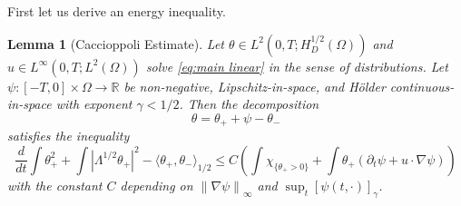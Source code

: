 \documentclass[11pt]{amsart}
\newtheorem{lemma}[theorem]{Lemma}
\theoremstyle{remark}
\theoremstyle{definition}
\newcommand{\R}{\mathbb{R}}
\newcommand{\chevron}[1]{\langle #1 \rangle}
\newcommand{\norm}[1]{\left\lVert#1\right\rVert}
\newcommand{\paren}[1]{\left( #1 \right)}
\newcommand{\bracket}[1]{\left[ #1 \right]}
\newcommand{\abs}[1]{\left\lvert #1 \right\rvert}
\newcommand{\del}{\partial}
\newcommand{\grad}{\nabla}
\newcommand{\ddt}{\frac{d}{dt}}
\newcommand{\indic}[1]{\chi_{\{#1\}}}
\begin{document}
First let us derive an energy inequality.  

\begin{lemma}[Caccioppoli Estimate] \label{thm:caccioppoli}
Let $\theta \in L^2(0,T; H_D^{1/2}(\Omega))$ and $u \in L^\infty(0,T; L^2(\Omega))$ solve \eqref{eq:main linear} in the sense of distributions.  Let $\psi: [-T,0]\times \Omega \to \R$ be non-negative, Lipschitz-in-space, and H\"{o}lder continuous-in-space with exponent $\gamma < 1/2$.  Then the decomposition
\[ \theta = \theta_+ + \psi - \theta_- \]
satisfies the inequality
\[ \ddt \int \theta_+^2 + \int \abs{\Lambda^{1/2} \theta_+}^2 - \chevron{\theta_+,\theta_-}_{1/2} \leq C \paren{ \int \indic{\theta_+ > 0} + \int \theta_+ (\del_t \psi + u\cdot\grad\psi) } \]
with the constant $C$ depending on $\norm{\grad \psi}_\infty$ and $\sup_t \bracket{\psi(t,\cdot)}_\gamma$.  

\end{lemma}
\end{document}
